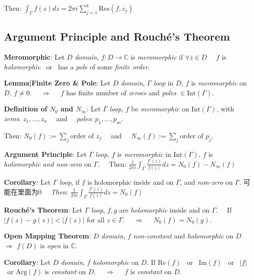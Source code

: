 \documentclass[9pt]{article}
\begin{document}
\quad Then: $\int_{\Gamma}f(z)dz=2\pi i\sum^k_{j=1}\text{Res}(f,z_j)$ 


\subsection{Argument Principle and Rouché's Theorem}

\textbf{Meromorphic}: Let $D$ \textit{domain}, $f:D\to\mathbb{C}$ is \textit{meromorphic} if $\forall z\in D$ \ \ $f$ is \textit{holomorphic} \ or \ has a \textit{pole} of some \textit{finite order}.

\quad \textbf{Lemma|Finite Zero \& Pole}: {\small Let $D$ \textit{domain}, $\Gamma$ \textit{loop} in $D$, $f$ is \textit{meromorphic} on $D$, $f\ne0$. \ \ $\Rightarrow$ \ \ $f$ has finite number of \textit{zeroes} and \textit{poles} $\in\text{Int}(\Gamma)$.}

\textbf{Definition of $N_0$ and $N_\infty$}: Let $\Gamma$ \textit{loop}, $f$ be \textit{meromorphic} on $\text{Int}(\Gamma)$, with \quad \textit{zeros}: $z_1,...,z_n$ \ \ and \ \ \textit{poles}: $p_1,...,p_m$.

\quad Then: $N_0(f):=\sum_j\text{order of }z_j$ \ \ and \ \ $N_\infty(f):=\sum_j\text{order of }p_j$.

\textbf{Argument Principle}: {\small Let $\Gamma$ \textit{loop}, $f$ is \textit{meromorphic} in $\text{Int}(\Gamma)$, $f$ is \textit{holomorphic and non-zero} on $\Gamma$. \ \ Then: $\frac{1}{2\pi i}\int_{\Gamma}\frac{f'(z)}{f(z)}dz=N_0(f)-N_\infty(f)$}

\quad \textbf{Corollary}: {\small Let $\Gamma$ \textit{loop}, if $f$ is holomorphic inside and on $\Gamma$, and \textit{non-zero} on $\Gamma$. {\tiny 可能在里面为0} \ \ \textit{Then}: $\frac{1}{2\pi i}\int_{\Gamma}\frac{f'(z)}{f(z)}dz=N_0(f)$}

\textbf{Rouché's Theorem}: Let $\Gamma$ \textit{loop}, $f,g$ are \textit{holomorphic} inside and on $\Gamma$. \ \ If $|f(z)-g(z)|<|f(z)|$ for all $z\in\Gamma$. \ \ $\Rightarrow$ \ \ $N_0(f) = N_0(g)$.

\textbf{Open Mapping Theorem}: $D$ \textit{domain}, $f$ \textit{non-constant} and \textit{holomorphic} on $D$ $\Rightarrow$ $f(D)$ is \textit{open} in $\mathbb{C}$.

\quad \textbf{Corollary}: Let $D$ \textit{domain}, $f$ \textit{holomorphic} on $D$. \quad If $\text{Re}(f)$ \ or \ $\text{Im}(f)$ \ or \ $|f|$ \ or $\text{Arg}(f)$ is \textit{constant} on $D$. \ \ $\Rightarrow$ \ \ $f$ is \textit{constant} on $D$.
\end{document}
